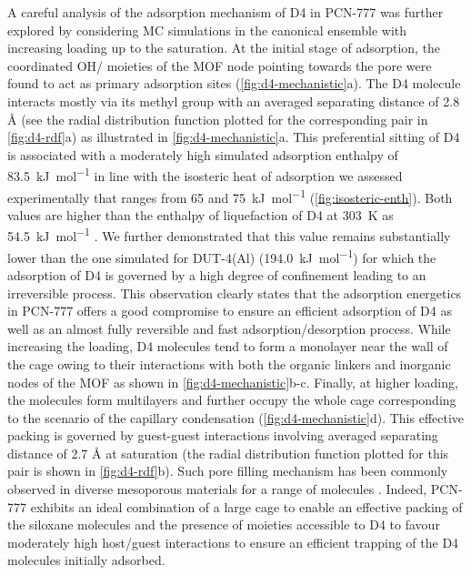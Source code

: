 A careful analysis of the adsorption mechanism of D4 in PCN-777 was further
explored by considering MC simulations in the canonical ensemble with increasing
loading up to the saturation. At the initial stage of adsorption, the
coordinated OH/ moieties of the MOF  node pointing towards the
pore were found to act as primary adsorption sites (\cref{fig:d4-mechanistic}a).
The D4 molecule interacts mostly via its methyl group with an averaged
separating  distance of 2.8 Å (see the radial distribution
function plotted for the corresponding pair in \cref{fig:d4-rdf}a) as
illustrated in \cref{fig:d4-mechanistic}a. This preferential sitting of D4 is
associated with a moderately high simulated adsorption enthalpy of
\SI{83.5}{\kilo\joule\per\mol} in line with the isosteric heat of adsorption we
assessed experimentally that ranges from 65 and \SI{75}{\kilo\joule\per\mol}
(\cref{fig:isosteric-enth}). Both values are higher than the enthalpy of
liquefaction of D4 at \SI{303}{\kelvin} as \SI{54.5}{\kilo\joule\per\mol}
\citep{lemmonNISTStandardReference2018}. We further demonstrated that this value
remains substantially lower than the one simulated for DUT-4(Al)
(\SI{194.0}{\kilo\joule\per\mol}) for which the adsorption of D4 is governed by
a high degree of confinement leading to an irreversible process. This
observation clearly states that the adsorption energetics in PCN-777 offers a
good compromise to ensure an efficient adsorption of D4 as well as an almost
fully reversible and fast adsorption/desorption process. While increasing the
loading, D4 molecules tend to form a monolayer near the wall of the cage owing
to their interactions with both the organic linkers and inorganic nodes of the
MOF as shown in \cref{fig:d4-mechanistic}b-c. Finally, at higher loading, the
molecules form multilayers and further occupy the whole cage corresponding to
the scenario of the capillary condensation (\cref{fig:d4-mechanistic}d). This
effective packing is governed by guest-guest interactions involving averaged
separating  distance of 2.7 Å at saturation (the radial
distribution function plotted for this pair is shown in \cref{fig:d4-rdf}b).
Such pore filling mechanism has been commonly observed in diverse mesoporous
materials for a range of molecules \citep{rouquerolAdsorptionPowdersPorous2013}.
Indeed, PCN-777 exhibits an ideal combination of a large cage to enable an
effective packing of the siloxane molecules and the presence of moieties
accessible to D4 to favour moderately high host/guest interactions to ensure an
efficient trapping of the D4 molecules initially adsorbed.

